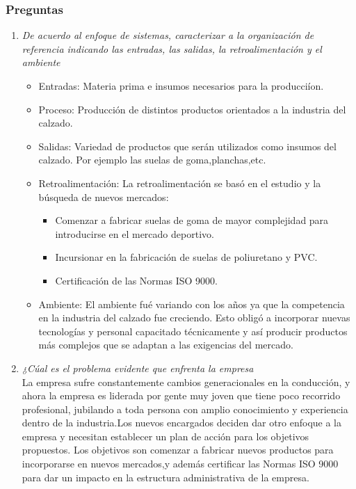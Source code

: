 \documentclass[a4paper,10pt]{article}
\begin{document}
	\subsubsection{Preguntas}
	
	\begin{enumerate}
		
			\item \textit{ De acuerdo al enfoque de sistemas, caracterizar a la organización de referencia indicando las entradas, las salidas, la retroalimentación y el ambiente}\\
			
			
			\begin{itemize}
			\item Entradas:
			Materia prima e insumos necesarios para la producci\'ion.
			\item Proceso:
			Producción de  distintos productos orientados a la industria del calzado.
			\item Salidas:
			Variedad de productos que serán utilizados como insumos del calzado. Por ejemplo las suelas de goma,planchas,etc.
			\item Retroalimentación:
			La retroalimentación se bas\'o en el estudio y la b\'usqueda de nuevos mercados:
			\begin{itemize}
			\item Comenzar a fabricar suelas de goma de mayor complejidad para introducirse en el mercado deportivo.
			\item Incursionar en la fabricación de suelas de poliuretano y PVC.
			\item Certificación de las Normas ISO 9000.
			\end{itemize}
			\item Ambiente:
			El ambiente fu\'e variando con los años ya que la competencia en la industria del calzado fue creciendo. Esto obligó a incorporar nuevas tecnologías y personal capacitado técnicamente y así producir productos más complejos que se adaptan a las exigencias del mercado.
			\end{itemize}		
			
			\item \textit{¿Cúal es el problema evidente que enfrenta la empresa}\\
			La empresa sufre constantemente cambios generacionales en la conducción, y  ahora la empresa es liderada por gente muy joven que tiene poco recorrido profesional, jubilando a toda persona con amplio conocimiento y experiencia dentro de la industria.Los nuevos encargados deciden dar otro enfoque a la empresa y necesitan establecer un plan de acción para los objetivos propuestos. Los objetivos son comenzar a fabricar nuevos productos para incorporarse en nuevos mercados,y adem\'as certificar las Normas ISO 9000 para dar un impacto en la estructura administrativa de la empresa.
			

\end{enumerate}
\end{document}
